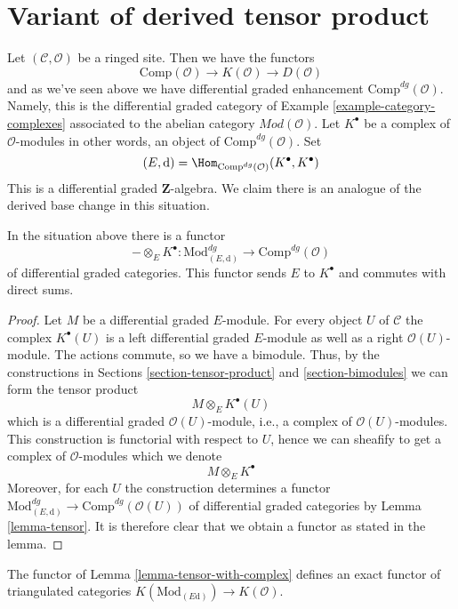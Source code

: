 \section{Variant of derived tensor product}
\label{section-variant-base-change}

\noindent
Let $(\mathcal{C}, \mathcal{O})$ be a ringed site. Then we have the functors
$$
\text{Comp}(\mathcal{O}) \to K(\mathcal{O}) \to D(\mathcal{O})
$$
and as we've seen above we have differential graded enhancement
$\text{Comp}^{dg}(\mathcal{O})$. Namely, this is the differential
graded category of Example \ref{example-category-complexes} associated
to the abelian category $\textit{Mod}(\mathcal{O})$.
Let $K^\bullet$ be a complex of $\mathcal{O}$-modules in other
words, an object of $\text{Comp}^{dg}(\mathcal{O})$. Set
$$
(E, \text{d}) =
\Hom_{\text{Comp}^{dg}(\mathcal{O})}(K^\bullet, K^\bullet)
$$
This is a differential graded $\mathbf{Z}$-algebra. We claim there is
an analogue of the derived base change in this situation.

\begin{lemma}
\label{lemma-tensor-with-complex}
In the situation above there is a functor
$$
- \otimes_E K^\bullet :
\text{Mod}^{dg}_{(E, \text{d})}
\longrightarrow
\text{Comp}^{dg}(\mathcal{O})
$$
of differential graded categories. This functor sends $E$ to $K^\bullet$
and commutes with direct sums.
\end{lemma}

\begin{proof}
Let $M$ be a differential graded $E$-module. For every object $U$ of
$\mathcal{C}$ the complex $K^\bullet(U)$ is a left differential
graded $E$-module as well as a right $\mathcal{O}(U)$-module.
The actions commute, so we have a bimodule.
Thus, by the constructions in
Sections \ref{section-tensor-product} and \ref{section-bimodules}
we can form the tensor product
$$
M \otimes_E K^\bullet(U)
$$
which is a differential graded $\mathcal{O}(U)$-module, i.e., a complex
of $\mathcal{O}(U)$-modules. This construction is functorial with respect
to $U$, hence we can sheafify to get a complex of $\mathcal{O}$-modules
which we denote
$$
M \otimes_E K^\bullet
$$
Moreover, for each $U$ the construction determines a functor
$\text{Mod}^{dg}_{(E, \text{d})} \to \text{Comp}^{dg}(\mathcal{O}(U))$
of differential graded categories by Lemma \ref{lemma-tensor}.
It is therefore clear that we obtain a functor as stated in the lemma.
\end{proof}

\begin{lemma}
\label{lemma-tensor-with-complex-homotopy}
The functor of Lemma \ref{lemma-tensor-with-complex} defines an exact functor
of triangulated categories
$K(\text{Mod}_{(E \text{d})}) \to K(\mathcal{O})$.
\end{lemma}

